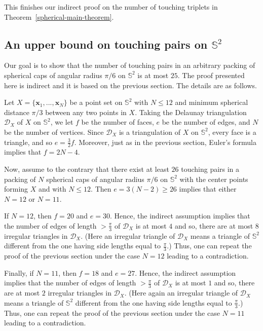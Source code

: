 \documentclass[10pt]{article}
\numberwithin{Subcase}{Case}
\begin{document}
This finishes our indirect proof on the number of touching triplets in Theorem~\ref{spherical-main-theorem}.


\subsection{An upper bound on touching pairs on $\mathbb{S}^2$}

Our goal is to show that the number of touching pairs in an arbitrary packing of spherical caps of angular radius $\pi/6$ on $\mathbb{S}^2$ is at most $25$. The proof presented here is indirect and it is based on the previous section. The details are as follows.

Let $X=\{\mathbf{x}_{1},...,\mathbf{x}_{N}\}$ be a point set on $\mathbb{S}^2$ with $N \leq 12$ and minimum spherical distance $\pi/3$ between any two points in $X$. Taking the Delaunay triangulation $\mathcal{D}_{X}$ of $X$ on $\mathbb{S}^2$, we let $f$ be the number of faces, $e$ be the number of edges, and $N$ be the number of vertices. Since $\mathcal{D}_{X}$ is a triangulation of $X$ on $\mathbb{S}^2$, every face is a triangle, and so $e=\frac{3}{2}f$. Moreover, just as in the previous section, Euler's formula implies that $f=2N-4$. 

Now, assume to the contrary that there exist at least $26$ touching pairs in a packing of $N$  spherical caps of angular radius $\pi/6$ on $\mathbb{S}^2$ with the center points forming $X$ and with $N\le 12$. Then $e=3(N-2)\ge 26$ implies that either $N=12$ or $N=11$.

If $N=12$, then $f=20$ and $e=30$. Hence, the indirect assumption implies that the number of edges of length $>\frac{\pi}{3}$ of $\mathcal{D}_{X}$ is at most $4$ and so, there are at most $8$ irregular triangles in $\mathcal{D}_{X}$. (Here an irregular triangle of $\mathcal{D}_{X}$ means a triangle of $\mathbb{S}^2$ different from the one having side lengths equal to $\frac{\pi}{3}$.) Thus, one can repeat the proof of the previous section under the case $N=12$ leading to a contradiction. 

Finally, if $N=11$, then $f=18$ and $e=27$. Hence, the indirect assumption implies that the number of edges of length $>\frac{\pi}{3}$ of $\mathcal{D}_{X}$ is at most $1$ and so, there are at most $2$ irregular triangles in $\mathcal{D}_{X}$. (Here again an irregular triangle of $\mathcal{D}_{X}$ means a triangle of $\mathbb{S}^2$ different from the one having side lengths equal to $\frac{\pi}{3}$.) Thus, one can repeat the proof of the previous section under the case $N=11$ leading to a contradiction.
\end{document}
